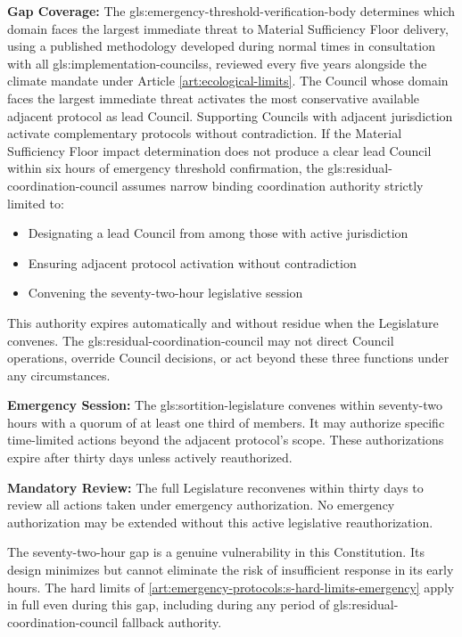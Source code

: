 \textbf{Gap Coverage:} The \gls{gls:emergency-threshold-verification-body} determines which domain faces the largest immediate threat to Material Sufficiency Floor delivery, using a published methodology developed during normal times in consultation with all \gls{gls:implementation-councils}s, reviewed every five years alongside the climate mandate under Article \ref{art:ecological-limits}. The Council whose domain faces the largest immediate threat activates the most conservative available adjacent protocol as lead Council. Supporting Councils with adjacent jurisdiction activate complementary protocols without contradiction. If the Material Sufficiency Floor impact determination does not produce a clear lead Council within six hours of emergency threshold confirmation, the \gls{gls:residual-coordination-council} assumes narrow binding coordination authority strictly limited to:
\begin{itemize}
  \item Designating a lead Council from among those with active jurisdiction
  \item Ensuring adjacent protocol activation without contradiction
  \item Convening the seventy-two-hour legislative session
\end{itemize}
This authority expires automatically and without residue when the Legislature convenes. The \gls{gls:residual-coordination-council} may not direct Council operations, override Council decisions, or act beyond these three functions under any circumstances.

\textbf{Emergency Session:} The \gls{gls:sortition-legislature} convenes within seventy-two hours with a quorum of at least one third of members. It may authorize specific time-limited actions beyond the adjacent protocol's scope. These authorizations expire after thirty days unless actively reauthorized.

\textbf{Mandatory Review:} The full Legislature reconvenes within thirty days to review all actions taken under emergency authorization. No emergency authorization may be extended without this active legislative reauthorization.

The seventy-two-hour gap is a genuine vulnerability in this Constitution. Its design minimizes but cannot eliminate the risk of insufficient response in its early hours. The hard limits of \ref{art:emergency-protocols:s-hard-limits-emergency} apply in full even during this gap, including during any period of \gls{gls:residual-coordination-council} fallback authority.

